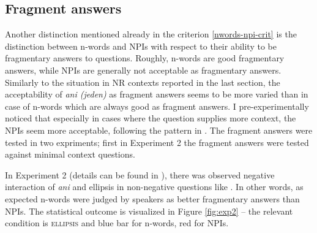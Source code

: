 \documentclass[output=paper,
]{langscibook}
\begin{document}
\subsection{Fragment answers}\label{fragment-answers}

Another distinction mentioned already in the criterion \ref{nwords-npi-crit} is the distinction between n-words and NPIs with respect to their ability to be fragmentary answers to questions. Roughly, n-words are good fragmentary answers, while NPIs are generally not acceptable as fragmentary answers. Similarly to the situation in NR contexts reported in the last section, the acceptability of \textit{ani (jeden)} as fragment answers seems to be more varied than in case of n-words which are always good as fragment answers. I pre-experimentally noticed that especially in cases where the question supplies more context, the NPIs seem more acceptable, following the pattern in . The fragment answers were tested in two expriments; first in Experiment 2 the fragment answers were tested against minimal context questions.

\ea \label{ex-32-5} 
\z
\z


\noindent In Experiment 2 (details can be found in \citealt{docekaldotlacilsubber}), there was observed negative interaction of \textit{ani} and ellipsis in non-negative questions like . In other words, as expected n-words were judged by speakers as better fragmentary answers than NPIs. The statistical outcome is visualized in Figure \ref{fig:exp2} -- the relevant condition is \textsc{ellipsis}  and blue bar for n-words, red for NPIs.

\z
\z
\end{document}
